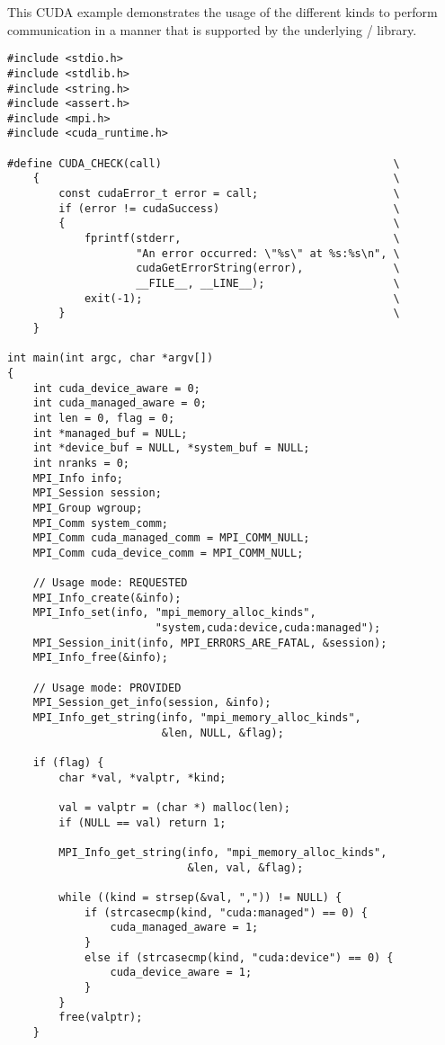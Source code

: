 \begin{example}
\label{example:alloc-kind-spm-cuda}
This CUDA example demonstrates the usage of the different
kinds to perform communication in a manner that is supported
by the underlying \mpi/ library.
\begin{lstlisting}[language={[MPI]C}]
#include <stdio.h>
#include <stdlib.h>
#include <string.h>
#include <assert.h>
#include <mpi.h>
#include <cuda_runtime.h>

#define CUDA_CHECK(call)                                    \
    {                                                       \
        const cudaError_t error = call;                     \
        if (error != cudaSuccess)                           \
        {                                                   \
            fprintf(stderr,                                 \
                    "An error occurred: \"%s\" at %s:%s\n", \
                    cudaGetErrorString(error),              \
                    __FILE__, __LINE__);                    \
            exit(-1);                                       \
        }                                                   \
    }

int main(int argc, char *argv[])
{
    int cuda_device_aware = 0;
    int cuda_managed_aware = 0;
    int len = 0, flag = 0;
    int *managed_buf = NULL;
    int *device_buf = NULL, *system_buf = NULL;
    int nranks = 0;
    MPI_Info info;
    MPI_Session session;
    MPI_Group wgroup;
    MPI_Comm system_comm;
    MPI_Comm cuda_managed_comm = MPI_COMM_NULL;
    MPI_Comm cuda_device_comm = MPI_COMM_NULL;

    // Usage mode: REQUESTED
    MPI_Info_create(&info);
    MPI_Info_set(info, "mpi_memory_alloc_kinds",
                       "system,cuda:device,cuda:managed");
    MPI_Session_init(info, MPI_ERRORS_ARE_FATAL, &session);
    MPI_Info_free(&info);

    // Usage mode: PROVIDED
    MPI_Session_get_info(session, &info);
    MPI_Info_get_string(info, "mpi_memory_alloc_kinds",
                        &len, NULL, &flag);

    if (flag) {
        char *val, *valptr, *kind;

        val = valptr = (char *) malloc(len);
        if (NULL == val) return 1;

        MPI_Info_get_string(info, "mpi_memory_alloc_kinds",
                            &len, val, &flag);

        while ((kind = strsep(&val, ",")) != NULL) {
            if (strcasecmp(kind, "cuda:managed") == 0) {
                cuda_managed_aware = 1;
            }
            else if (strcasecmp(kind, "cuda:device") == 0) {
                cuda_device_aware = 1;
            }
        }
        free(valptr);
    }


\end{lstlisting}
\end{example}

